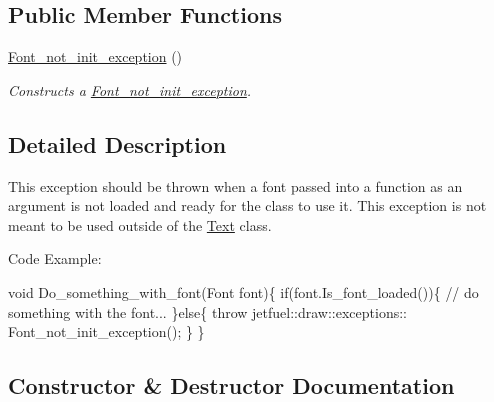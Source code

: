 \subsection*{Public Member Functions}
\begin{DoxyCompactItemize}
\item 
\hyperlink{classjetfuel_1_1draw_1_1exceptions_1_1Font__not__init__exception_af3e44125242cd74a0c2694abc15bec86}{Font\+\_\+not\+\_\+init\+\_\+exception} ()
\begin{DoxyCompactList}\small\item\em Constructs a \hyperlink{classjetfuel_1_1draw_1_1exceptions_1_1Font__not__init__exception}{Font\+\_\+not\+\_\+init\+\_\+exception}. \end{DoxyCompactList}\end{DoxyCompactItemize}


\subsection{Detailed Description}
This exception should be thrown when a font passed into a function as an argument is not loaded and ready for the class to use it. This exception is not meant to be used outside of the \hyperlink{classjetfuel_1_1draw_1_1Text}{Text} class.

Code Example\+: 
\begin{DoxyCode}
\textcolor{keywordtype}{void} Do\_something\_with\_font(Font font)\{
    \textcolor{keywordflow}{if}(font.Is\_font\_loaded())\{
        \textcolor{comment}{// do something with the font...}
    \}\textcolor{keywordflow}{else}\{
        \textcolor{keywordflow}{throw} jetfuel::draw::exceptions::
              Font\_not\_init\_exception();
    \}
\}
\end{DoxyCode}
 

\subsection{Constructor \& Destructor Documentation}
\mbox{\label{classjetfuel_1_1draw_1_1exceptions_1_1Font__not__init__exception_af3e44125242cd74a0c2694abc15bec86}} 
